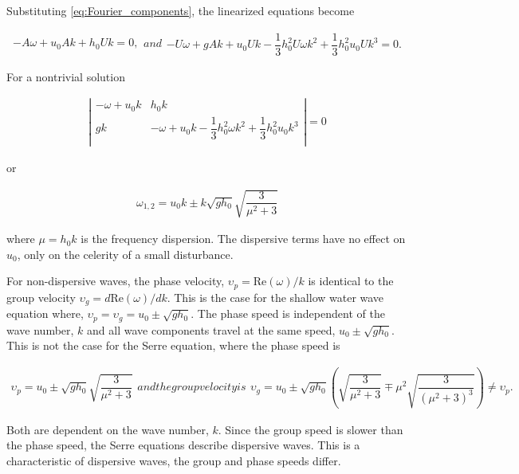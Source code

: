 \documentclass[SingleSpace,12pt]{Serre_ASCE}
\begin{document}
Substituting \eqref{eq:Fourier_components}, the linearized equations become
\begin{linenomath*}
\begin{subequations}
\begin{gather}
-A \omega + u_0 A k + h_0 U k = 0,
\end{gather}
and
\begin{gather}
- U \omega +  g A k +  u_0 U k - \dfrac{1}{3} h_0^2 U  \omega k^2 + \dfrac{1}{3} h_0^2 u_0 U  k^3 = 0.
\end{gather}
\end{subequations}
\end{linenomath*}
For a nontrivial solution
\begin{linenomath*}
\begin{gather*}
\left|
  \begin{array}{cc}
     -\omega + u_0 k & h_0 k \\
    g k & -\omega + u_0 k - \dfrac{1}{3} h_0^2 \omega k^2 + \dfrac{1}{3} h_0^2 u_0 k^3 \\
  \end{array}
\right| = 0
\end{gather*}
\end{linenomath*}
or
\begin{linenomath*}
\begin{gather*}
\omega_{1,2} = u_0 k \pm k \sqrt{g h_0} \sqrt{\dfrac{3}{\mu^2 + 3}} \nonumber
\end{gather*}
\end{linenomath*}
where $\mu = h_0k$ is the frequency dispersion. The dispersive terms have no effect on $u_0$, only on the celerity of a small disturbance.

For non-dispersive waves, the phase velocity, $\upsilon_p = \text{Re}(\omega)/k$ is identical to the group velocity $\upsilon_g = d\text{Re}(\omega)/dk$. This is the case for the shallow water wave equation where, $\upsilon_p = \upsilon_g = u_0 \pm \sqrt{gh_0}$. The phase speed is independent of the wave number, $k$ and all wave components travel at the same speed, $u_0 \pm \sqrt{g h_0}$. This is not the case for the Serre equation, where the phase speed is
\begin{linenomath*}
\begin{subequations}
\label{eq:wave_speeds_Serre_equations}
\begin{gather}
\upsilon_p = u_0 \pm \sqrt{gh_0}\sqrt{\dfrac{3}{\mu^2 + 3}}
\end{gather}
and the group velocity is
\begin{gather}
\upsilon_g = u_0 \pm \sqrt{gh_0}\left ( \sqrt{\dfrac{3}{\mu^2 + 3}} \mp \mu^2 \sqrt{\dfrac{3}{(\mu^2 + 3)^3}} \right ) \neq \upsilon_p.
\end{gather}
\end{subequations}
\end{linenomath*}
Both are dependent on the wave number, $k$. Since the group speed is slower than the phase speed, the Serre equations describe dispersive waves. This is a characteristic of dispersive waves, the group and phase speeds differ.
\end{document}
